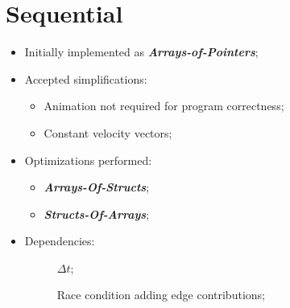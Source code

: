 \section{Sequential}

\begin{frame}
	\begin{itemize}
		\item Initially implemented as \textbf{\itshape Arrays-of-Pointers};
		\item Accepted simplifications:
		\begin{itemize}
			\item Animation not required for program correctness;
			\item Constant velocity vectors;
		\end{itemize}
		\item Optimizations performed:
		\begin{itemize}
			\item \textbf{\itshape Arrays-Of-Structs};
			\item \textbf{\itshape Structs-Of-Arrays};
		\end{itemize}
		\item Dependencies:
		\begin{description}
			\item[\computeflux] $\Delta t$;
			\item[\update] Race condition adding edge contributions;
		\end{description}
	\end{itemize}
\end{frame}